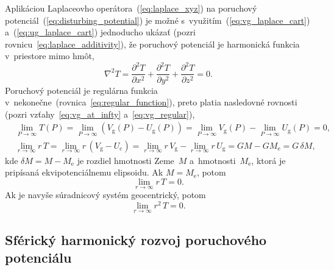 \documentclass[a4paper,12pt]{book}
\newcommand{\gidx}{\mathrm g}
\newcommand{\cidx}{\mathrm c}
\begin{document}
Aplikáciou Laplaceovho operátora~(\ref{eq:laplace_xyz}) na poruchový 
potenciál~(\ref{eq:disturbing_potential}) je možné 
s~využitím~(\ref{eq:vg_laplace_cart}) a~(\ref{eq:ug_laplace_cart}) jednoducho 
ukázať (pozri rovnicu~\ref{eq:laplace_additivity}), že poruchový potenciál je 
harmonická funkcia v~priestore mimo hmôt,
%
\begin{equation}
\label{eq:laplace_xyz_t}
\nabla^2 T = \frac{\partial^2 T}{\partial x^2} + \frac{\partial^2 T}{\partial 
y^2} + \frac{\partial^2 T}{\partial z^2} = 0{.}
\end{equation}
%
Poruchový potenciál je regulárna funkcia 
v~nekonečne~(rovnica~\ref{eq:regular_function}), preto platia nasledovné 
rovnosti (pozri vzťahy~\ref{eq:vg_at_infty} a~\ref{eq:vg_regular}),
%
\begin{align}
\label{eq:t_infty}
&\lim_{P \rightarrow \infty} T(P) = \lim_{P \rightarrow \infty} (V_\gidx(P) 
- U_\gidx(P)) = \lim_{P \rightarrow \infty} V_\gidx(P) - \lim_{P \rightarrow 
\infty} U_\gidx(P) = 0{,}\\
%
\label{eq:t_regular}
&\lim_{r \rightarrow \infty} r \, T = \lim_{r \rightarrow \infty} r \, (V_\gidx 
 - U_\cidx) = \lim_{r \rightarrow \infty} r \, V_\gidx - \lim_{r \rightarrow 
 \infty} r \, U_\gidx = GM - GM_{\mathrm{e}} = G \, \delta M{,}
\end{align}
%
kde $\delta M = M - M_\mathrm{e}$ je rozdiel hmotnosti Zeme~$M$ 
a~hmotnosti~$M_\mathrm{e}$, ktorá je pripísaná ekvipotenciálnemu elipsoidu.  Ak 
$M = M_\mathrm{e}$, potom
%
\begin{equation}
\lim_{r \rightarrow \infty} r \, T = 0{.}
\end{equation}
%
Ak je navyše súradnicový systém geocentrický, potom \parencite{Pick1973}
%
\begin{equation}
\lim_{r \rightarrow \infty} r^2 \, T = 0{.}
\end{equation}


\subsection{Sférický harmonický rozvoj poruchového potenciálu}
\end{document}
